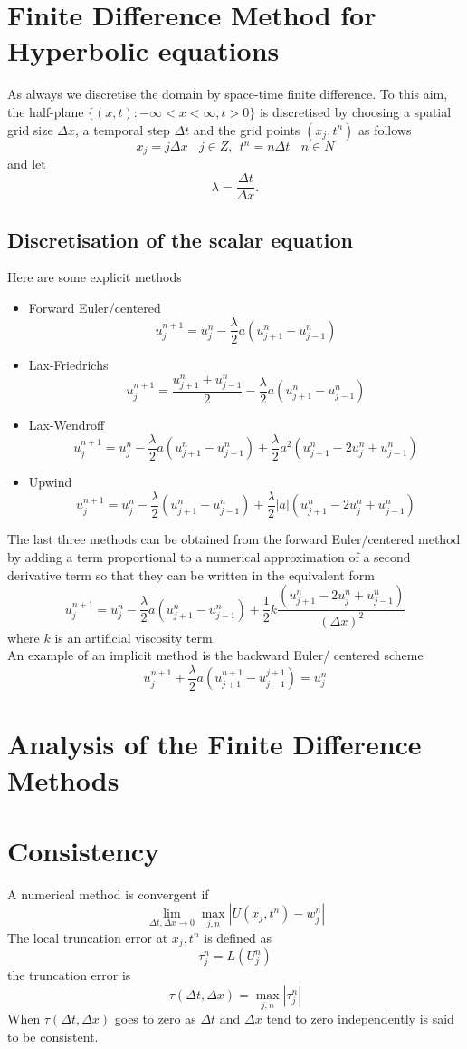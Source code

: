 \section{Finite Difference Method for Hyperbolic equations}
As always we discretise the domain by space-time finite difference.  To this aim,
the half-plane $\{(x,t): -\infty <x<\infty, t>0 \}$ is discretised by choosing
a spatial grid size $\Delta x$, a temporal step $\Delta t$ and the grid
points $(x_j,t^n)$ as follows
\[x_j=j\Delta x  \ \ \ \ j \in Z, \ \ t^n=n\Delta t \ \ \ \ n \in N \]
and let 
\[\lambda =\frac{\Delta t}{\Delta x}. \]
\subsection{Discretisation of the scalar equation }
Here are some explicit methods 
\begin{itemize}
\item
Forward Euler/centered
\[ u^{n+1}_j=u^{n}_{j}-\frac{\lambda}{2}a(u^{n}_{j+1}-u^{n}_{j-1})\]
\item
Lax-Friedrichs
\[ u^{n+1}_j=\frac{u^{n}_{j+1}+u_{j-1}^n}{2}-\frac{\lambda}{2}a(u^{n}_{j+1}-u^{n}_{j-1})\]
\item
Lax-Wendroff
\[ u^{n+1}_j=u^{n}_{j}-\frac{\lambda}{2}a(u^{n}_{j+1}-u^{n}_{j-1})+\frac{\lambda}{2}a^2(u^{n}_{j+1}-2u_{j}^n+u^{n}_{j-1})\]
\item
Upwind
\[ u^{n+1}_j=u^{n}_{j}-\frac{\lambda}{2}(u^{n}_{j+1}-u^{n}_{j-1})+\frac{\lambda}{2}|a|(u^{n}_{j+1}-2u_{j}^n+u^{n}_{j-1})
\]
\end{itemize}

The last three methods can be obtained from the forward Euler/centered method by
adding a term proportional to a numerical approximation of a second derivative term so that they can be written in the equivalent form
\[ u^{n+1}_j=u^{n}_{j}-\frac{\lambda}{2}a(u^{n}_{j+1}-u^{n}_{j-1})+\frac{1}{2}k\frac{(u^{n}_{j+1}-2u_{j}^n+u^{n}_{j-1})}{(\Delta x)^2}\]
where $k$ is an artificial viscosity term.\\
An example of an implicit method is the backward Euler/ centered scheme
\[u^{n+1}_j+\frac{\lambda}{2}a(u_{j+1}^{n+1} - u_{j-1}^{j+1})=u_{j}^n \]

\section{Analysis of the Finite Difference Methods}
\section{Consistency}
A numerical method is convergent if 
\[\lim_{\Delta t,\Delta x \rightarrow 0} \max_{j,n}|U(x_j,t^n)-w_j^n| \] 
The local truncation error at $x_j,t^n$ is defined as
\[\tau_j^n = L(U^n_j) \]
the truncation error is 
\[\tau(\Delta t, \Delta x) = \max_{j,n}|\tau^n_j| \]
When $\tau(\Delta t, \Delta x)$ goes to zero as $\Delta t$ and $\Delta x$ tend to
zero independently is said to be consistent.
